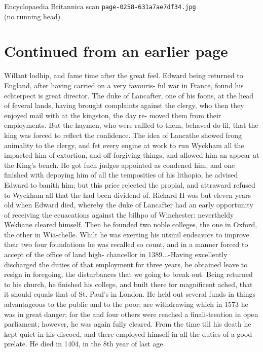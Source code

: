 \documentclass{article}
\begin{document}
\begin{center}
{\Large Encyclopaedia Britannica scan \texttt{page-0258-631a7ae7df34.jpg}}\\[0.5em]
(no running head)
\end{center}
\section*{Continued from an earlier page}
Willant lodhip, and fame time after the great feel. Edward being returned to England, after having carried on a very favouris- ful war in France, found his echterpect is great director. The duke of Lancafter, one of his foons, at the head of feveral lands, having brought complaints against the clergy, who then they enjoyed mail with at the kingston, the day re- moved them from their employments. But the haymen, who were raffled to them, behaved do fil, that the king was forced to reflect the confidence. The idea of Lancathe showed frong animality to the clergy, and fet every engine at work to run Wyckham all the impacted him of extortion, and off-forgiving things, and allowed him an appear at the King's bench. He got fuch judges appointed as condened him; and one finished with depoying him of all the temposities of his lithopio, he advised Edward to banith him; but this price rejected the propial, and attraward refused to Wyckham all that the had been dividend of. Richard II was but eleven years old when Edward died, whereby the duke of Lancafter had an early opportunity of receiving the ecuacations against the bilhpo of Winchester: nevertheldy Wekhane cleared himself. Then he founded two noble colleges, the one in Oxford, the other in Wia-chelle. Whilt he was exerting his utsmil endeavors to improve their two four foundations he was recalled so count, and in a manner forced to accept of the office of land high- chancellor in 1389...-Having excellently discharged the duties of that employment for three years, be obtained leave to resign in foregoing, the disturbances that we going to break out. Being returned to his church, he finished his college, and built there for magnificent ached, that it should equals that of St. Paul’s in London. He held out several funds in things advantageous to the public and to the poor; are withdrawing which in 1573 he was in great danger; for the and four others were reached a finali-treation in open parliament; however, he was again fully cleared. From the time till his death he kept quiet in his discoed, and there employed himself in all the duties of a good prelate. He died in 1404, in the 8th year of last age.
\end{document}
